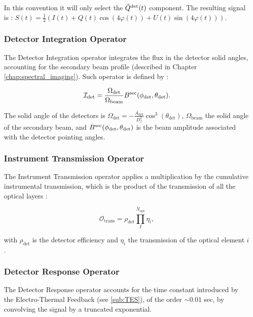 \documentclass[../../thesis.tex]{subfiles}
\begin{document}
In this convention it will only select the $\tilde{Q}^{\rm det}(t)$ component. The resulting signal is : $S(t) = \frac{1}{2} \left(I(t) + Q(t)\cos(4\varphi(t)) + U(t)\sin(4\varphi(t))\right)$.

\subsubsection{Detector Integration Operator}

The Detector Integration operator integrates the flux in the detector solid angles, accounting for the secondary beam profile (described in Chapter \ref{chap:spectral_imaging}). Such operator is defined by : 

\begin{equation}
    {\cal I}_{\rm det}= \frac{\Omega_{\rm det}}{\Omega_{\rm beam}} B^{\rm sec}(\phi_{\rm det}, \theta_{\rm det}).
\end{equation}

The solid angle of the detectors is $\Omega_{\text{det}}=-\frac{A_{\text{det}}}{D_f^2}\cos^3(\theta_{\text{det}})$, $\Omega_{\text{beam}}$ the solid angle of the secondary beam, and $B^{\rm sec}(\phi_{\rm det}, \theta_{\rm det})$ is the beam amplitude associated with the detector pointing angles.   

\subsubsection{Instrument Transmission Operator}

The Instrument Transmission operator applies a multiplication by the cumulative instrumental transmission, which is the product of the transmission of all the optical layers :

\begin{equation}
    \mathcal{O}_{\text{trans}} = \rho_{\text{det}} \prod_{I}^{N_{\text{opt}}} \eta_i,
\end{equation}

with $\rho_{\text{det}}$ is the detector efficiency and $\eta_i$ the transmission of the optical element $i$.

\subsubsection{Detector Response Operator}

The Detector Response operator accounts for the time constant introduced by the Electro-Thermal Feedback (see \ref{sub:TES}), of the order $\sim 0.01$ sec, by convolving the signal by a truncated exponential.
\end{document}
